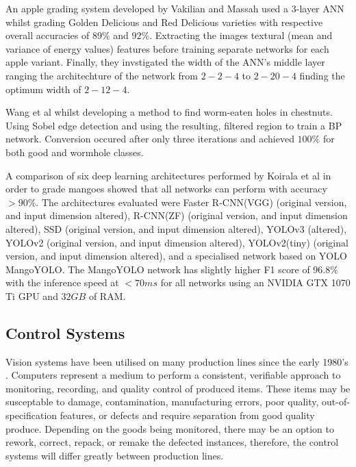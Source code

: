 \documentclass[fleqn,twoside]{article}
\begin{document}
An apple grading system developed by Vakilian and Massah \cite{vakilian} used a 3-layer ANN whilst grading Golden Delicious and Red Delicious varieties with respective overall accuracies of $89\%$ and $92\%$. Extracting the images textural (mean and variance of energy values) features before training separate networks for each apple variant. Finally, they invstigated the width of the ANN's middle layer ranging the architechture of the network from $2-2-4$ to $2-20-4$ finding the optimum width of $2-12-4$. 


Wang et al \cite{wang} whilst developing a method to find worm-eaten holes in chestnuts. Using Sobel edge detection and using the resulting, filtered region to train a BP network. Conversion occured after only three iterations and achieved $100\%$ for both good and wormhole classes. 

A comparison of six deep learning architectures performed by Koirala et al \cite{koirala} in order to grade mangoes showed that all networks can perform with accuracy $>90\%$. The architectures evaluated were Faster R-CNN(VGG) (original version, and input dimension altered), R-CNN(ZF) (original version, and input dimension altered), SSD (original version, and input dimension altered), YOLOv3 (altered), YOLOv2 (original version, and input dimension altered), YOLOv2(tiny) (original version, and input dimension altered), and a specialised network based on YOLO MangoYOLO. The MangoYOLO network has slightly higher F1 score of $96.8\%$ with the inference speed at $<70ms$ for all networks using an NVIDIA GTX 1070 Ti GPU and $32GB$ of RAM.






\subsection{Control Systems}

Vision systems have been utilised on many production lines since the early 1980's \cite{kruger}. Computers represent a medium to perform a consistent, verifiable approach to monitoring, recording, and quality control of produced items. These items may be susceptable to damage, contamination, manufacturing errors, poor quality, out-of-specification features, or defects and require separation from good quality produce. Depending on the goods being monitored, there may be an option to rework, correct, repack, or remake the defected instances, therefore, the control systems will differ greatly between production lines.   
\end{document}

